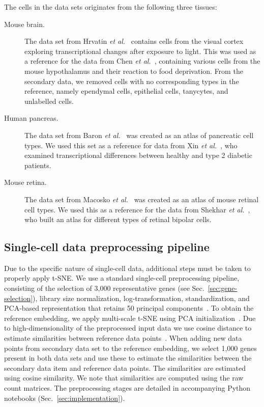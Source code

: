 \documentclass[runningheads]{llncs}
\newcommand{\etal}{\textit{et al.}}
\begin{document}
The cells in the data sets originates from the following three tissues:
\begin{description}
\item[Mouse brain.] The data set from Hrvatin \etal~\cite{hrvatin2018} contains
cells from the visual cortex exploring transcriptional changes after exposure
to light. This was used as a reference for the data from Chen
\etal~\cite{chen2017}, containing various cells from the mouse hypothalamus and
their reaction to food deprivation. From the secondary data, we removed cells
with no corresponding types in the reference, namely ependymal cells,
epithelial cells, tanycytes, and unlabelled cells.

\item[Human pancreas.] The data set from Baron \etal~\cite{baron2016} was
created as an atlas of pancreatic cell types. We used this set as a reference
for data from Xin \etal~\cite{xin2016}, who examined transcriptional
differences between healthy and type 2 diabetic patients.

\item[Mouse retina.] The data set from Macosko \etal~\cite{macosko2015} was
created as an atlas of mouse retinal cell types. We used this as a reference
for the data from Shekhar \etal~\cite{shekhar2016}, who built an atlas for
different types of retinal bipolar cells.
\end{description}

\subsection{Single-cell data preprocessing pipeline}

Due to the specific nature of single-cell data, additional steps must be taken
to properly apply t-SNE. We use a standard single-cell preprocessing pipeline,
consisting of the selection of 3,000 representative genes (see
Sec.~\ref{sec:gene-selection}), library size normalization, log-transformation,
standardization, and PCA-based representation that retains 50 principal
components~\cite{seurat,scanpy}. To obtain the reference embedding, we apply
multi-scale t-SNE using PCA initialization~\cite{art_of_using_tsne}. Due to
high-dimensionality of the preprocessed input data we use cosine distance to
estimate similarities between reference data points~\cite{Domingos2012-CACM}.
When adding new data points from secondary data set to the reference embedding,
we select 1,000 genes present in both data sets and use these to estimate the
similarities between the secondary data item and reference data points. The
similarities are estimated using cosine similarity. We note that similarities are
computed using the raw count matrices. The preprocessing stages are detailed in
accompanying Python notebooks (Sec.~\ref{sec:implementation}).
\end{document}
